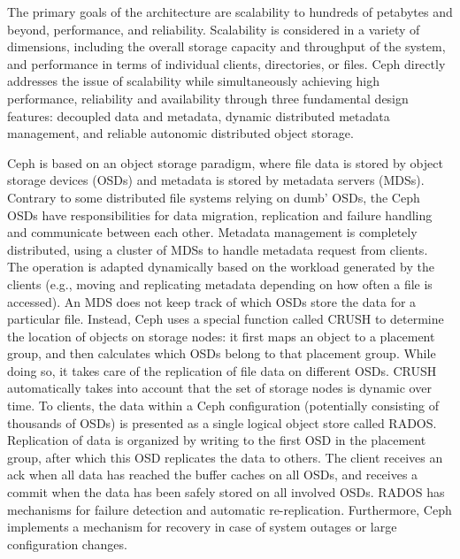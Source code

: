\documentclass[11pt]{article}
\begin{document}
The primary goals of the architecture are scalability to hundreds of 
petabytes and beyond, performance, and reliability. Scalability is 
considered in a variety of dimensions, including the overall storage 
capacity and throughput of the system, and performance in terms of 
individual clients, directories, or files. Ceph directly addresses the 
issue of scalability while simultaneously achieving high performance, 
reliability and availability through three fundamental design features: 
decoupled data and metadata, dynamic distributed metadata management, 
and reliable autonomic distributed object storage.

Ceph is based on an object storage paradigm, where file data is stored 
by object storage devices (OSDs) and metadata is stored by metadata 
servers (MDSs). Contrary to some distributed file systems relying on 
dumb’ OSDs, the Ceph OSDs have responsibilities for data migration, 
replication and failure handling and communicate between each other. 
Metadata management is completely distributed, using a cluster of MDSs 
to handle metadata request from clients. The operation is adapted 
dynamically based on the workload generated by the clients (e.g., moving 
and replicating metadata depending on how often a file is accessed).
An MDS does not keep track of which OSDs store the data for a particular 
file. Instead, Ceph uses a special function called CRUSH to determine the 
location of objects on storage nodes: it first maps an object to a 
placement group, and then calculates which OSDs belong to that placement 
group. While doing so, it takes care of the replication of file data on 
different OSDs. CRUSH automatically takes into account that the set of 
storage nodes is dynamic over time. To clients, the data within a Ceph 
configuration (potentially consisting of thousands of OSDs) is presented 
as a single logical object store called RADOS. Replication of data is 
organized by writing to the first OSD in the placement group, after which 
this OSD replicates the data to others. The client receives an ack when 
all data has reached the buffer caches on all OSDs, and receives a commit 
when the data has been safely stored on all involved OSDs. RADOS has 
mechanisms for failure detection and automatic re-replication. Furthermore, 
Ceph implements a mechanism for recovery in case of system outages or 
large configuration changes.
\end{document}
